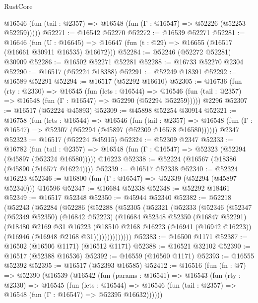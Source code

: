 \begin{lexlean}{RustCore}
\begin{coremodule}
      @16546 (fun (tail : @2357) => @16548 (fun (Γ : @16547) => @52226 (@52253 @52259)))))
@52271 := @16542 @52270
@52272 := @16539 @52271
@52281 := @16646
    (fun (U : @16645) => @16647 (fun (t : @29) => @16655 (@16517 (@16661 @30911 @16535) @16672)))
@52284 := @52246 (@52272 @52281) @30909
@52286 := @16502 @52271 @52281
@52288 := @16733 @52270 @2304
@52290 := @16517 (@52224 @18388)
@52291 := @52249 @18391
@52292 := @16589 @52291
@52294 := @16517 (@52292 @16610)
@52305 := @16736
    (fun (rty : @2330) =>
    @16545
      (fun (lets : @16544) =>
      @16546 (fun (tail : @2357) => @16548 (fun (Γ : @16547) => @52290 (@52294 @52259)))))
    @2296
@52307 := @16517 (@52224 @45893)
@52309 := @45898 @52254 @30914
@52321 := @16758
    (fun (lets : @16544) =>
    @16546
      (fun (tail : @2357) =>
      @16548 (fun (Γ : @16547) => @52307 (@52294 (@45897 (@52309 @16578 @16580))))))
    @2347
@52323 := @16517 (@52224 @45915)
@52324 := @52309 @2347
@52333 := @16782
    (fun (tail : @2357) => @16548 (fun (Γ : @16547) => @52323 (@52294 (@45897 (@52324 @16580)))))
    @16223
@52338 := @52224 (@16567 (@18386 (@45890 (@16577 @16224))))
@52339 := @16517 @52338
@52340 := @52324 @16223
@52346 := @16800 (fun (Γ : @16547) => @52339 (@52294 (@45897 @52340))) @16596
@52347 := @16684 @52338
@52348 := @52292 @18461
@52349 := @16517 @52348
@52350 := @45944 @52340
@52382 := @52218
    (@52243
      (@52284
        (@52286
          (@52288
            (@52305
              (@52321
                (@52333
                  (@52346
                    (@52347
                      (@52349 @52350)
                      (@16842 @52223)
                      (@16684
                        @52348
                        @52350
                        (@16847 @52291)
                        (@18480
                          @2169
                          @31
                          @16223
                          (@18510
                            @2168
                            @16223
                            (@16941 (@16942 @16223))
                            (@16946 (@16948 @2168 @31))))))))))))))
@52383 := @16500 @1171
@52387 := @16502 (@16506 @1171) (@16512 @1171)
@52388 := @16521 @32102
@52390 := @16517 (@52388 @16536)
@52392 := @16559 (@16560 @1171)
@52393 := @16555 @52392
@52395 := @16517 (@52393 @16585)
@52412 := @16516
    (fun (fn : @7) =>
    @52390
      (@16539
        (@16542
          (fun (params : @16541) =>
          @16543
            (fun (rty : @2330) =>
            @16545
              (fun (lets : @16544) =>
              @16546 (fun (tail : @2357) => @16548 (fun (Γ : @16547) => @52395 @16632))))))

\end{coremodule}
\end{lexlean}
